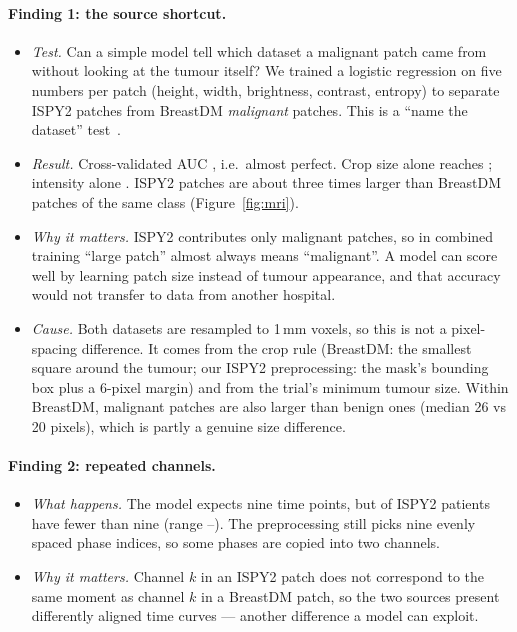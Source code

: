 \documentclass[11pt]{article}
\begin{document}
\paragraph{Finding 1: the source shortcut.}
\begin{itemize}
  \item \emph{Test.} Can a simple model tell which dataset a malignant patch
  came from without looking at the tumour itself? We trained a logistic
  regression on five numbers per patch (height, width, brightness, contrast,
  entropy) to separate ISPY2 patches from BreastDM \emph{malignant} patches.
  This is a ``name the dataset'' test~\citep{torralba2011bias}.
  \item \emph{Result.} Cross-validated AUC \probeAll{}, i.e.\ almost perfect.
  Crop size alone reaches \probeSize{}; intensity alone \probeIntensity{}.
  ISPY2 patches are about three times larger than BreastDM patches of the
  same class (Figure~\ref{fig:mri}).
  \item \emph{Why it matters.} ISPY2 contributes only malignant patches, so in
  combined training ``large patch'' almost always means ``malignant''. A model
  can score well by learning patch size instead of tumour appearance, and that
  accuracy would not transfer to data from another hospital.
  \item \emph{Cause.} Both datasets are resampled to 1\,mm voxels, so this is
  not a pixel-spacing difference. It comes from the crop rule (BreastDM: the
  smallest square around the tumour; our ISPY2 preprocessing: the mask's
  bounding box plus a 6-pixel margin) and from the trial's minimum tumour size.
  Within BreastDM, malignant patches are also larger than benign ones (median
  26 vs 20 pixels), which is partly a genuine size difference.
\end{itemize}

\paragraph{Finding 2: repeated channels.}
\begin{itemize}
  \item \emph{What happens.} The model expects nine time points, but
  \ispyRepeated{} of \ispyCases{} ISPY2 patients have fewer than nine (range
  \ispyPhasesMin--\ispyPhasesMax). The preprocessing still picks nine evenly
  spaced phase indices, so some phases are copied into two channels.
  \item \emph{Why it matters.} Channel $k$ in an ISPY2 patch does not
  correspond to the same moment as channel $k$ in a BreastDM patch, so the two
  sources present differently aligned time curves --- another difference a
  model can exploit.
\end{itemize}
\end{document}

